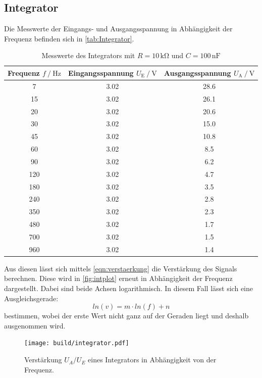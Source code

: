 \newpage

\subsection{Integrator}
Die Messwerte der Eingangs- und Ausgangsspannung in Abhängigkeit der Frequenz befinden sich in \autoref{tab:Integrator}. 
\begin{table}
    \centering
    \caption{Messwerte des Integrators mit $R=10\,\unit{\kilo\ohm}$ und $C=100\,\unit{\nano\farad}$}
    \begin{tabular}{c c c}
        \toprule
        Frequenz $f\mathbin{/}\unit{\hertz}$ & Eingangsspannung $U_{\text{E}}\mathbin{/}\unit{\volt}$& Ausgangsspannung $U_{\text{A}}\mathbin{/}\unit{\volt}$ \\
        \midrule
        7& 3.02 & 28.6 \\
        15 & 3.02 & 26.1 \\
        20 & 3.02 & 20.6 \\
        30 & 3.02 & 15.0 \\
        45 & 3.02 & 10.8 \\
        60 & 3.02 & 8.5 \\
        90 & 3.02 & 6.2 \\
        120 & 3.02 & 4.7 \\
        180 & 3.02 & 3.5 \\
        240 & 3.02 & 2.8 \\
        350 & 3.02 & 2.3 \\
        480 & 3.02 & 1.7 \\
        700 & 3.02 & 1.5 \\
        960 & 3.02 & 1.4 \\
        \bottomrule
    \end{tabular}
    \label{tab:Integrator}
\end{table}
Aus diesen lässt sich mittels \autoref{eqn:verstaerkung} die Verstärkung des Signals berechnen. Diese wird in \autoref{fig:intplot} erneut
in Abhängigkeit der Frequenz dargestellt. Dabei sind beide Achsen logarithmisch. In diesem Fall lässt sich eine Ausgleichsgerade:
\begin{equation}
    ln(v) = m \cdot ln(f) + n
    \label{eqn:ausgleichger}
\end{equation} 
bestimmen, wobei der erste Wert nicht ganz auf der Geraden liegt und deshalb ausgenommen wird. 
\begin{figure}
    \centering
    \texttt{[image: build/integrator.pdf]}
    \caption{Verstärkung $U_A/U_E$ eines Integrators in Abhängigkeit von der Frequenz.}
    \label{fig:intplot}
\end{figure}
